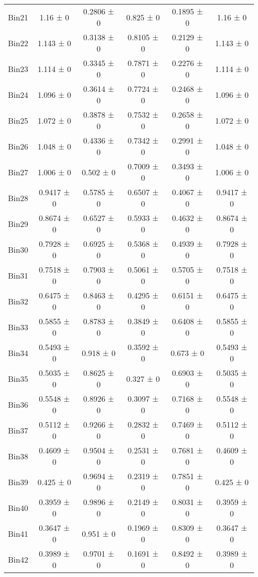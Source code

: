 \begin{tabular}{@{\extracolsep{4pt}}lccccc@{}}
     Bin21 & 1.16 ± 0 & 0.2806 ± 0 & 0.825 ± 0 & 0.1895 ± 0 & 1.16 ± 0 \\ 
     Bin22 & 1.143 ± 0 & 0.3138 ± 0 & 0.8105 ± 0 & 0.2129 ± 0 & 1.143 ± 0 \\ 
     Bin23 & 1.114 ± 0 & 0.3345 ± 0 & 0.7871 ± 0 & 0.2276 ± 0 & 1.114 ± 0 \\ 
     Bin24 & 1.096 ± 0 & 0.3614 ± 0 & 0.7724 ± 0 & 0.2468 ± 0 & 1.096 ± 0 \\ 
     Bin25 & 1.072 ± 0 & 0.3878 ± 0 & 0.7532 ± 0 & 0.2658 ± 0 & 1.072 ± 0 \\ 
     Bin26 & 1.048 ± 0 & 0.4336 ± 0 & 0.7342 ± 0 & 0.2991 ± 0 & 1.048 ± 0 \\ 
     Bin27 & 1.006 ± 0 & 0.502 ± 0 & 0.7009 ± 0 & 0.3493 ± 0 & 1.006 ± 0 \\ 
     Bin28 & 0.9417 ± 0 & 0.5785 ± 0 & 0.6507 ± 0 & 0.4067 ± 0 & 0.9417 ± 0 \\ 
     Bin29 & 0.8674 ± 0 & 0.6527 ± 0 & 0.5933 ± 0 & 0.4632 ± 0 & 0.8674 ± 0 \\ 
     Bin30 & 0.7928 ± 0 & 0.6925 ± 0 & 0.5368 ± 0 & 0.4939 ± 0 & 0.7928 ± 0 \\ 
     Bin31 & 0.7518 ± 0 & 0.7903 ± 0 & 0.5061 ± 0 & 0.5705 ± 0 & 0.7518 ± 0 \\ 
     Bin32 & 0.6475 ± 0 & 0.8463 ± 0 & 0.4295 ± 0 & 0.6151 ± 0 & 0.6475 ± 0 \\ 
     Bin33 & 0.5855 ± 0 & 0.8783 ± 0 & 0.3849 ± 0 & 0.6408 ± 0 & 0.5855 ± 0 \\ 
     Bin34 & 0.5493 ± 0 & 0.918 ± 0 & 0.3592 ± 0 & 0.673 ± 0 & 0.5493 ± 0 \\ 
     Bin35 & 0.5035 ± 0 & 0.8625 ± 0 & 0.327 ± 0 & 0.6903 ± 0 & 0.5035 ± 0 \\ 
     Bin36 & 0.5548 ± 0 & 0.8926 ± 0 & 0.3097 ± 0 & 0.7168 ± 0 & 0.5548 ± 0 \\ 
     Bin37 & 0.5112 ± 0 & 0.9266 ± 0 & 0.2832 ± 0 & 0.7469 ± 0 & 0.5112 ± 0 \\ 
     Bin38 & 0.4609 ± 0 & 0.9504 ± 0 & 0.2531 ± 0 & 0.7681 ± 0 & 0.4609 ± 0 \\ 
     Bin39 & 0.425 ± 0 & 0.9694 ± 0 & 0.2319 ± 0 & 0.7851 ± 0 & 0.425 ± 0 \\ 
     Bin40 & 0.3959 ± 0 & 0.9896 ± 0 & 0.2149 ± 0 & 0.8031 ± 0 & 0.3959 ± 0 \\ 
     Bin41 & 0.3647 ± 0 & 0.951 ± 0 & 0.1969 ± 0 & 0.8309 ± 0 & 0.3647 ± 0 \\ 
     Bin42 & 0.3989 ± 0 & 0.9701 ± 0 & 0.1691 ± 0 & 0.8492 ± 0 & 0.3989 ± 0 \\ 

\end{tabular}
